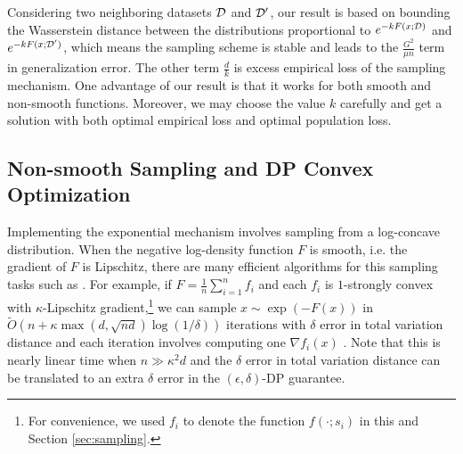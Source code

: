Considering two neighboring datasets $\mathcal D$ and $\mathcal D'$, our result is based on bounding the Wasserstein distance between the distributions proportional to $e^{-kF(x;\mathcal D)}$ and $e^{-kF(x;\mathcal D')}$, which means the sampling scheme is stable and leads to the $\frac{G^2}{\mu n}$ term in generalization error.
The other term $\frac{d}{k}$ is excess empirical loss of the sampling mechanism.
One advantage of our result is that it works for both smooth and non-smooth functions. 
Moreover, we may choose the value $k$ carefully and get a solution with both optimal empirical loss and optimal population loss.



\subsection{Non-smooth Sampling and DP Convex Optimization }
Implementing the exponential mechanism involves sampling from a log-concave distribution.
When the negative log-density function $F$ is smooth, i.e. the gradient of $F$ is Lipschitz,
there are many efficient algorithms for this sampling tasks
such as \cite{D17,LSV18,MMW+19,CV19,DMM19,shen2019randomized,CDW+20,LST20}.
For example, if $F=\frac{1}{n}\sum_{i=1}^{n}f_{i}$
and each $f_{i}$ is $1$-strongly convex with $\kappa$-Lipschitz
gradient,\footnote{For convenience, we used $f_{i}$ to denote the function $f(\cdot;s_i)$ in this and Section \ref{sec:sampling}.} we can sample $x\sim\exp(-F(x))$ in $\widetilde{O}(n+\kappa\max(d,\sqrt{nd})\log(1/\delta))$
iterations with $\delta$ error in total variation distance and each iteration involves computing one $\nabla f_{i}(x)$ \cite{LST21}.
Note that this is nearly linear time when $n\gg\kappa^2d$ and the $\delta$ error in
total variation distance can be translated to an extra $\delta$ error in the $(\epsilon,\delta)$-DP
guarantee.

